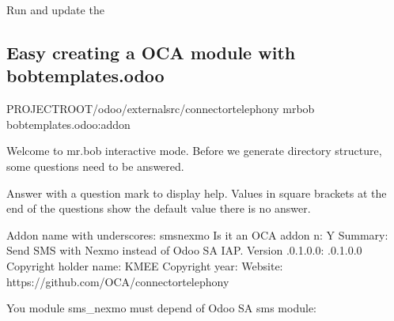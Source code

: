\documentclass[letterpaper,10pt,english]{sphinxmanual}
\begin{document}
Run  and update the 


\subsection{Easy creating a OCA module with bobtemplates.odoo}
\label{\detokenize{technical:easy-creating-a-oca-module-with-bobtemplates-odoo}}
%
\begin{sphinxVerbatim}[commandchars=\\\{\}]
 PROJECT\PYGZus{}ROOT/odoo/external\PYGZhy{}src/connector\PYGZhy{}telephony
mrbob bobtemplates.odoo:addon

Welcome to mr.bob interactive mode. Before we generate directory structure,
some questions need to be answered.

Answer with a question mark to display help.
Values in square brackets at the end of the questions show the
default value  there is no answer.

\PYGZhy{}\PYGZhy{}\PYGZgt{} Addon name with underscores: sms\PYGZus{}nexmo
\PYGZhy{}\PYGZhy{}\PYGZgt{} Is it an OCA addon \PYG{o}{[}n\PYG{o}{]}: Y
\PYGZhy{}\PYGZhy{}\PYGZgt{} Summary: Send SMS with Nexmo instead of Odoo SA IAP.
\PYGZhy{}\PYGZhy{}\PYGZgt{} Version \PYG{o}{[}.0.1.0.0\PYG{o}{]}: .0.1.0.0
\PYGZhy{}\PYGZhy{}\PYGZgt{} Copyright holder name: KMEE
\PYGZhy{}\PYGZhy{}\PYGZgt{} Copyright year: 
\PYGZhy{}\PYGZhy{}\PYGZgt{} Website: https://github.com/OCA/connector\PYGZhy{}telephony
\end{sphinxVerbatim}
\sphinxresetverbatimhllines

You module sms\_nexmo must depend of Odoo SA sms module:
\end{document}
